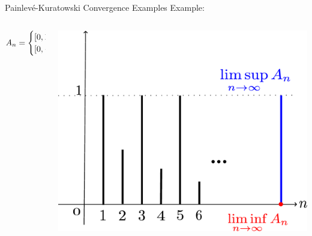 \documentclass[aspectratio=169, dvipdfmx, 11pt]{beamer} %
\newcommand{\Painleve}{Painlev\'e}
\begin{document}
\begin{frame}[t]{\Painleve-Kuratowski Convergence Examples}
  Example:

  \centering
  \begin{columns}
    \begin{column}{0.48\textwidth}
    \centering
    \begin{equation}
      A_n = \begin{cases} [0, 1],  & \mbox{if }n\mbox{ is odd} \\ [0, \frac{1}{n}], & \mbox{if }n\mbox{ is even} \end{cases} \notag
    \end{equation}
    \end{column}
    \pause
    \begin{column}{0.48\textwidth}
    \centering
    \includegraphics[keepaspectratio, scale=0.160]{figures/example_limsup_and_liminf.eps}
    \end{column}
  \end{columns}
\end{frame}
\end{document}
